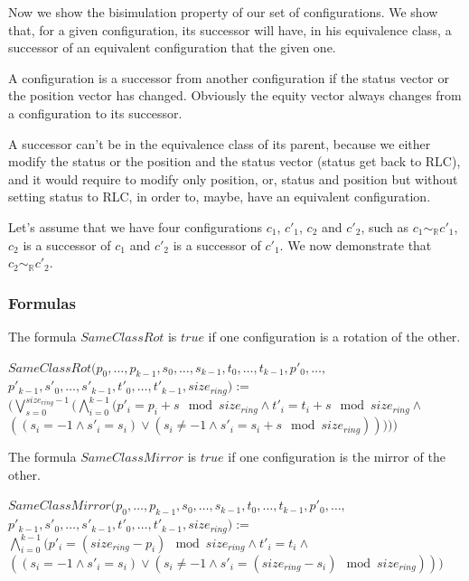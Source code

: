 \documentclass{article}
\begin{document}
Now we show the bisimulation property of our set of configurations. We show that, for a given configuration, its successor will have, in his equivalence class, a successor of an equivalent configuration that the given one.

A configuration is a successor from another configuration if the status vector or the position vector has changed. Obviously the equity vector always changes from a configuration to its successor.

A successor can't be in the equivalence class of its parent, because we either modify the status or the position and the status vector (status get back to RLC), and it would require to modify only position, or, status and position but without setting status to RLC, in order to, maybe, have an equivalent configuration.

Let's assume that we have four configurations $c_{1}$, $c'_{1}$, $c_{2}$ and $c'_{2}$, such as $c_{1}\sim_{\mathbb{R}}c'_{1}$, $c_{2}$ is a successor of $c_{1}$ and $c'_{2}$ is a successor of $c'_{1}$. We now demonstrate that $c_{2}\sim_{\mathbb{R}}c'_{2}$.


\subsubsection{Formulas}

\noindent The formula $SameClassRot$ is $true$ if one configuration is a rotation of the other.

\begin{center}
    
$SameClassRot (p_{0}, \dots, p_{k-1}, s_{0}, \dots, s_{k-1}, t_{0}, \dots, t_{k-1}, p'_{0}, \dots,$\\
$p'_{k-1}, s'_{0}, \dots, s'_{k-1}, t'_{0}, \dots, t'_{k-1}, size_{ring}):=$\\
$ (\bigvee_{s=0}^{size_{ring}-1}  ( \bigwedge_{i=0}^{k-1}  (p'_{i} = p_{i}+s \mod{size_{ring}} \land t'_{i} = t_{i}+s \mod{size_{ring}} \land$\\
$ ( (s_{i} = -1 \land s'_{i} = s_{i}) \lor  (s_{i} \not= -1 \land s'_{i} = s_{i}+s \mod{size_{ring}}) ) ) ))$
\end{center}

\noindent The formula $SameClassMirror$ is $true$ if one configuration is the mirror of the other.

\begin{center}
    
    $SameClassMirror (p_{0}, \dots, p_{k-1}, s_{0}, \dots, s_{k-1}, t_{0}, \dots, t_{k-1}, p'_{0}, \dots,$\\
    $p'_{k-1}, s'_{0}, \dots, s'_{k-1}, t'_{0}, \dots, t'_{k-1}, size_{ring}):=$\\
    $\bigwedge_{i=0}^{k-1} ( p'_{i} =  (size_{ring} - p_{i})\mod{size_{ring}} \land t'_{i} = t_{i} \land$ \\
    $ ( (s_{i} = -1 \land s'_{i} = s_{i}) \lor  (s_{i} \not= -1 \land s'_{i} =  (size_{ring} - s_{i})\mod{size_{ring}}))) $
\end{center}
\end{document}
